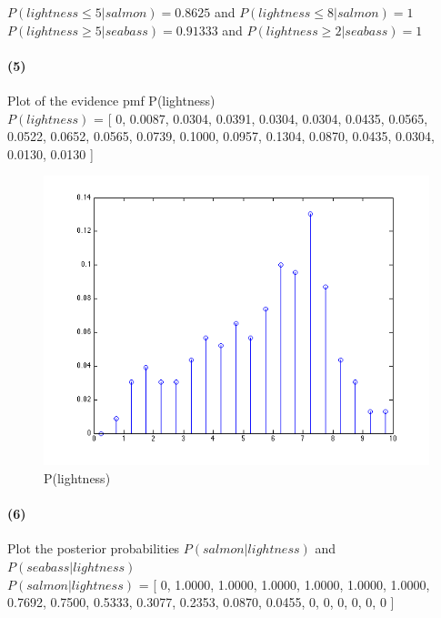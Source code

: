 \documentclass[a4paper]{article}
\begin{document}
$P(lightness\le5|salmon) = 0.8625$ and $P(lightness\le8|salmon) = 1$ \\

$P(lightness\ge5|seabass) = 0.91333$ and $P(lightness\ge2|seabass) = 1$

%
%
\paragraph{(5) } Plot of the evidence pmf P(lightness) ~\\

$P(lightness)$ = [
         0,
    0.0087,
    0.0304,
    0.0391,
    0.0304,
    0.0304,
    0.0435,
    0.0565,
    0.0522,
    0.0652,
    0.0565,
    0.0739,
    0.1000,
    0.0957,
    0.1304,
    0.0870,
    0.0435,
    0.0304,
    0.0130,
    0.0130 ] \\
\begin{figure}[H]
  \centering
    \includegraphics[scale=.6]{images/p_lightness.png}
  \caption{P(lightness)}
\end{figure}

%
%
\paragraph{(6) } Plot the posterior probabilities $P(salmon|lightness)$ and $P(seabass|lightness)$ ~\\

$P(salmon|lightness)$ = [
         0,
    1.0000,
    1.0000,
    1.0000,
    1.0000,
    1.0000,
    1.0000,
    0.7692,
    0.7500,
    0.5333,
    0.3077,
    0.2353,
    0.0870,
    0.0455,
         0,
         0,
         0,
         0,
         0,
         0 ]\\
\end{document}
